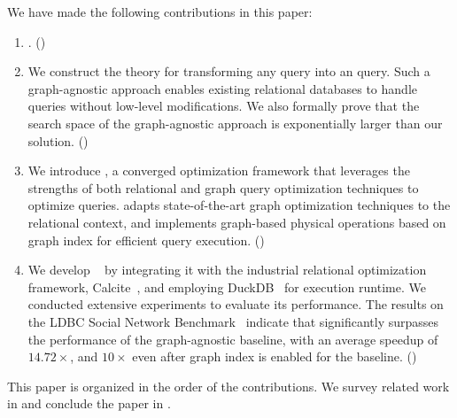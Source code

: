 We have made the following contributions in this paper:
\begin{enumerate}
\item {}. \hfill()

\item We construct the theory for transforming any \spjm query into an \spj query. Such a graph-agnostic approach enables existing relational databases to handle \spjm queries without low-level modifications. We also formally prove that the search space
of the graph-agnostic approach is exponentially larger than our solution. \hfill()

\item We introduce \name, a converged optimization framework that leverages the strengths of both relational and graph query optimization techniques to optimize \spjm queries. \name adapts state-of-the-art graph optimization techniques to the relational context, and implements graph-based physical operations based on graph index for efficient query execution. \hfill()

\item We develop \name~ by integrating it with the industrial relational optimization framework, Calcite~\cite{calcite}, and employing DuckDB~\cite{duckdb} for execution runtime. We conducted extensive experiments to evaluate its performance. The results on the LDBC Social Network Benchmark~\cite{ldbc_snb} indicate that \name significantly surpasses the performance of the graph-agnostic baseline, with an average speedup of $14.72\times$, and $10\times$ even after graph index is enabled for the baseline. \hfill()

\end{enumerate}

This paper is organized in the order of the contributions. We survey related work in 
and conclude the paper in .

